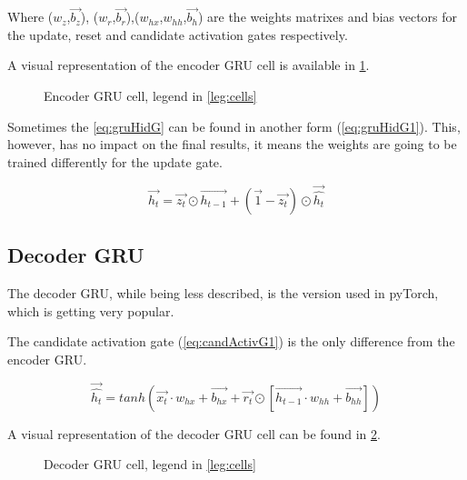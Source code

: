 Where ($w_z$,$\overrightarrow{b_z}$), ($w_r$,$\overrightarrow{b_r}$),($w_{hx}$,$w_{hh}$,$\overrightarrow{b_h}$) are the weights matrixes and bias vectors for the update, reset and candidate activation gates respectively.

A visual representation of the encoder \ac{GRU} cell is available in \cref{fig:encoderGruCell}.

\begin{figure}[H]
  \centering
  
  \caption{Encoder \acs{GRU} cell, legend in \cref{leg:cells}}
  \label{fig:encoderGruCell}
\end{figure}

Sometimes the \cref{eq:gruHidG} can be found in another form (\cref{eq:gruHidG1})\cite{gruPyTorch}. This, however, has no impact on the final results, it means the weights are going to be trained differently for the update gate.

\begin{equation}\label{eq:gruHidG1}
  \overrightarrow{h_t}=\overrightarrow{z_t}\odot \overrightarrow{h_{t-1}} + (\overrightarrow{1}-\overrightarrow{z_t})\odot \overrightarrow{\hat{h_t}}
\end{equation}

\subsection{Decoder \ac{GRU}}

The decoder \ac{GRU}, while being less described, is the version used in pyTorch, which is getting very popular.

The candidate activation gate (\cref{eq:candActivG1}) is the only difference from the encoder \ac{GRU}.

\begin{equation}\label{eq:candActivG1}
  \overrightarrow{\hat{h_t}}=tanh(\overrightarrow{x_t}\cdot w_{hx}+ \overrightarrow{b_{hx}}+\overrightarrow{r_t}\odot[\overrightarrow{h_{t-1}} \cdot w_{hh} + \overrightarrow{b_{hh}}])
\end{equation}

A visual representation of the decoder \ac{GRU} cell can be found in \cref{fig:decoderGruCell}.

\begin{figure}[H]
  \centering
  
  \caption{Decoder \acs{GRU} cell, legend in \cref{leg:cells}}
  \label{fig:decoderGruCell}
\end{figure}

